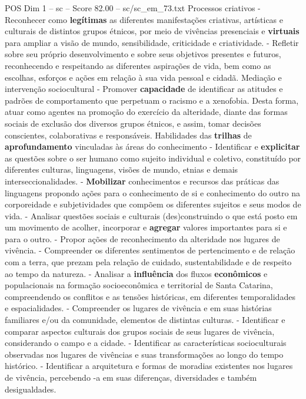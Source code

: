 \begin{textsample}{POS Dim 1 – sc – Score 82.00 – sc/sc\_em\_73.txt}
Processos criativos - Reconhecer como \textbf{legítimas} as diferentes manifestações criativas, artísticas e culturais de distintos grupos étnicos, por meio de vivências presenciais e \textbf{virtuais} para ampliar a visão de mundo, sensibilidade, criticidade e criatividade. - Refletir sobre seu próprio desenvolvimento e sobre seus objetivos presentes e futuros, reconhecendo e respeitando as diferentes aspirações de vida, bem como as escolhas, esforços e ações em relação à sua vida pessoal e cidadã.
Mediação e intervenção sociocultural - Promover \textbf{capacidade} de identificar as atitudes e padrões de comportamento que perpetuam o racismo e a xenofobia.
Desta forma, atuar como agentes na promoção do exercício da alteridade, diante das formas sociais de exclusão dos diversos grupos étnicos, e assim, tomar decisões conscientes, colaborativas e responsáveis.
Habilidades das \textbf{trilhas} de \textbf{aprofundamento} vinculadas às áreas do conhecimento - Identificar e \textbf{explicitar} as questões sobre o ser humano como sujeito individual e coletivo, constituído por diferentes culturas, linguagens, visões de mundo, etnias e demais interseccionalidades. - \textbf{Mobilizar} conhecimentos e recursos das práticas das linguagens propondo ações para o conhecimento de si e conhecimento do outro na corporeidade e subjetividades que compõem os diferentes sujeitos e seus modos de vida. - Analisar questões sociais e culturais (des)construindo o que está posto em um movimento de acolher, incorporar e \textbf{agregar} valores importantes para si e para o outro. - Propor ações de reconhecimento da alteridade nos lugares de vivência. - Compreender os diferentes sentimentos de pertencimento e de relação com a terra, que prezam pela relação de cuidado, sustentabilidade e de respeito ao tempo da natureza. - Analisar a \textbf{influência} dos fluxos \textbf{econômicos} e populacionais na formação socioeconômica e territorial de Santa Catarina, compreendendo os conflitos e as tensões históricas, em diferentes temporalidades e espacialidades. - Compreender os lugares de vivência e em suas histórias familiares e/ou da comunidade, elementos de distintas culturas. - Identificar e comparar aspectos culturais dos grupos sociais de seus lugares de vivência, considerando o campo e a cidade. - Identificar as características socioculturais observadas nos lugares de vivências e suas transformações ao longo do tempo histórico. - Identificar a arquitetura e formas de moradias existentes nos lugares de vivência, percebendo -a em suas diferenças, diversidades e também desigualdades.

\end{textsample}
